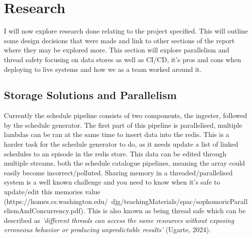\section{Research}
  I will now explore research done relating to the project specified. This will outline some design decisions that were made and link to other 
  sections of the report where they may be explored more. This section will explore parallelism and thread safety focusing on data stores as well as 
  CI/CD, it's pros and cons when deploying to live systems and how we as a team worked around it.



  \subsection{Storage Solutions and Parallelism}
  \label{sec:storageSolutions}

  Currently the schedule pipeline consists of two components, the ingester, followed by the schedule generator. The first part of this pipeline is
  parallelised, multiple lambdas can be ran at the same time to insert data into the redis. This is a harder task for the schedule generator to do,
  as it needs update a list of linked schedules to an episode in the redis store. This data can be edited through multiple streams, both the schedule
  catalogue pipelines, meaning the array could easily become incorrect/polluted. Sharing memory in a threaded/parallelised system is a well known 
  challenge and you need to know when it's safe to update/edit this memories value (https://homes.cs.washington.edu/~djg/teachingMaterials/spac/sophomoricParallelismAndConcurrency.pdf).
  This is also known as being thread safe which can be described as \textit{'different threads can access the same resources without exposing erroneous 
  behavior or producing unpredictable results'} (Ugarte, 2024).

